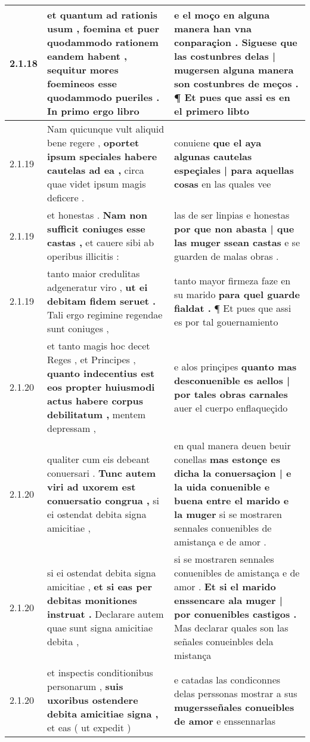 \begin{tabular}{|p{1cm}|p{6.5cm}|p{6.5cm}|}
2.1.18 & et quantum ad rationis usum , \textbf{ foemina et puer quodammodo rationem eandem habent , sequitur mores foemineos esse quodammodo pueriles . } In primo ergo libro & e el moço en alguna manera han vna conparaçion . \textbf{ Siguese que las costunbres delas | mugersen alguna manera son costunbres de meços . } ¶ Et pues que assi es en el primero libto \\\hline
2.1.19 & Nam quicunque vult aliquid bene regere , \textbf{ oportet ipsum speciales habere cautelas ad ea , } circa quae videt ipsum magis deficere . & conuiene \textbf{ que el aya algunas cautelas espeçiales | para aquellas cosas } en las quales vee \\\hline
2.1.19 & et honestas . \textbf{ Nam non sufficit coniuges esse castas , } et cauere sibi ab operibus illicitis : & las de ser linpias e honestas \textbf{ por que non abasta | que las muger ssean castas } e se guarden de malas obras . \\\hline
2.1.19 & tanto maior credulitas adgeneratur viro , \textbf{ ut ei debitam fidem seruet . } Tali ergo regimine regendae sunt coniuges , & tanto mayor firmeza faze en su marido \textbf{ para quel guarde fialdat . } ¶ Et pues que assi es por tal gouernamiento \\\hline
2.1.20 & et tanto magis hoc decet Reges , et Principes , \textbf{ quanto indecentius est eos propter huiusmodi actus habere corpus debilitatum , } mentem depressam , & e alos prinçipes \textbf{ quanto mas desconuenible es aellos | por tales obras carnales } auer el cuerpo enflaqueçido \\\hline
2.1.20 & qualiter cum eis debeant conuersari . \textbf{ Tunc autem viri ad uxorem est conuersatio congrua , } si ei ostendat debita signa amicitiae , & en qual manera deuen beuir conellas \textbf{ mas estonçe es dicha la conuersaçion | e la uida conuenible e buena entre el marido e la muger } si se mostraren sennales conuenibles de amistança e de amor . \\\hline
2.1.20 & si ei ostendat debita signa amicitiae , \textbf{ et si eas per debitas monitiones instruat . } Declarare autem quae sunt signa amicitiae debita , & si se mostraren sennales conuenibles de amistança e de amor . \textbf{ Et si el marido enssencare ala muger | por conuenibles castigos . } Mas declarar quales son las señales conueinbles dela mistança \\\hline
2.1.20 & et inspectis conditionibus personarum , \textbf{ suis uxoribus ostendere debita amicitiae signa , } et eas ( ut expedit ) & e catadas las condiconnes delas perssonas mostrar a sus \textbf{ mugersseñales conueibles de amor } e enssennarlas \\\hline

\end{tabular}
